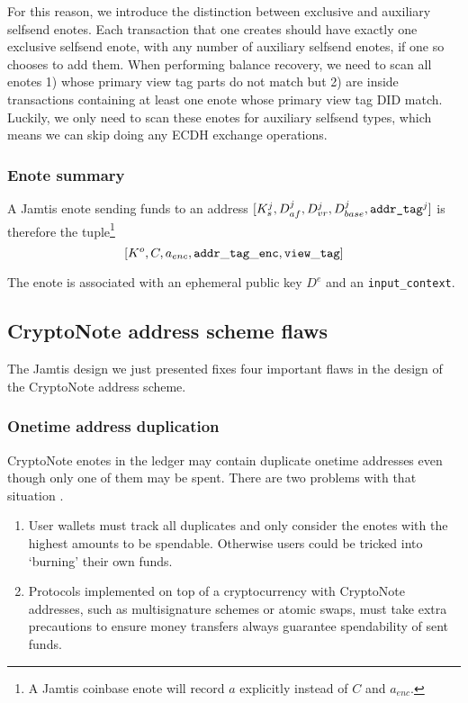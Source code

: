 For this reason, we introduce the distinction between exclusive and auxiliary selfsend enotes. Each transaction that one creates should have exactly one exclusive selfsend enote, with any number of auxiliary selfsend enotes, if one so chooses to add them. When performing balance recovery, we need to scan all enotes 1) whose primary view tag parts do not match but 2) are inside transactions containing at least one enote whose primary view tag DID match. Luckily, we only need to scan these enotes for auxiliary selfsend types, which means we can skip doing any ECDH exchange operations.

\subsubsection{Enote summary}
\label{subsubsec:jamtis-enote-construction-view-tag}

A Jamtis enote sending funds to an address $[K^j_s, D^j_{af}, D^j_{vr}, D^j_{base}, \textrm{\tt addr\_tag}^j]$ is therefore the tuple\footnote{A Jamtis coinbase enote will record $a$ explicitly instead of $C$ and $a_{enc}$.}\vspace{.115cm}
\[ [K^o, C, a_{enc}, {\tt addr\_tag\_enc}, {\tt view\_tag}] \]

The enote is associated with an ephemeral public key $D^e$ and an {\tt input\_context}.


\subsection{CryptoNote address scheme flaws}
\label{subsec:jamtis-cryptonote-address-scheme-flaws}

The Jamtis design we just presented fixes four important flaws in the design of the CryptoNote address scheme.

\subsubsection{Onetime address duplication}
\label{subsubsec:jamtis-cryptonote-flaws-duplication}

CryptoNote enotes in the ledger may contain duplicate onetime addresses even though only one of them may be spent. There are two problems with that situation \cite{burning-bug-mrl-103}.
\begin{enumerate}
    \item User wallets must track all duplicates and only consider the enotes with the highest amounts to be spendable. Otherwise users could be tricked into `burning' their own funds.
    \item Protocols implemented on top of a cryptocurrency with CryptoNote addresses, such as multisignature schemes or atomic swaps, must take extra precautions to ensure money transfers always guarantee spendability of sent funds.
\end{enumerate}

